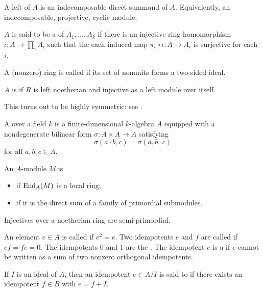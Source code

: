 \documentclass[12pt]{article}
\begin{document}
\begin{defn}
	A left  of $A$ is an indecomposable direct summand of $A$. 
	Equivalently, an indecomposable, projective, cyclic module.
\end{defn}

\begin{defn} \label{defn:subdirect-product}
	$A$ is said to be a  of $A_{1}, \ldots, A_{k}$  if 
	there is an injective ring homomorphism $\iota \colon A \to \prod_{i} A_{i}$ such that 
	the each induced map $\pi_{i} \circ \iota \colon A \to A_{i}$ is surjective for each $i$.
\end{defn}

\begin{defn}
	A (nonzero) ring is called  if its set of nonunits forms a two-sided ideal.
\end{defn}

\begin{defn}
	$A$ is  if $R$ is left noetherian and injective as a left module over itself.
\end{defn}
This turns out to be highly symmetric: see .

\begin{defn}
	A  over a field $k$ is a finite-dimensional $k$-algebra $A$ equipped with 
	a nondegenerate bilinear form $\sigma \colon A \times A \to A$ satisfying
	\begin{equation*} 
		\sigma(a \cdot b, c) = \sigma(a, b \cdot c)
	\end{equation*}
	for all $a, b, c \in A$.
\end{defn}

\begin{defn}
	An $A$-module $M$ is 
	\begin{itemize}
		\item {} if $\operatorname{End}_{A}(M)$ is a local ring;
		\item {} if it is the direct sum of a family of primordial submodules.
	\end{itemize}
\end{defn}
Injectives over a noetherian ring are semi-primordial.

\begin{defn}
	An element $e \in A$ is called  if $e^{2} = e$. 
	Two idempotents $e$ and $f$ are called  if $ef = fe = 0$. 
	The idempotents $0$ and $1$ are the .
	The idempotent $e$ is a  if $e$ cannot be written as a sum of two nonzero orthogonal idempotents.

	If $I$ is an ideal of $A$, then an idempotent $e \in A/I$ is said to  if there exists an idempotent $f \in B$ with $e = f + I$.
\end{defn}
\end{document}
